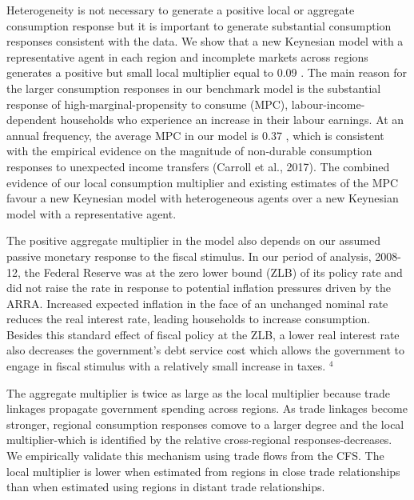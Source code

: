 \documentclass[10pt]{article}
\begin{document}
Heterogeneity is not necessary to generate a positive local or aggregate consumption response but it is important to generate substantial consumption responses consistent with the data. We show that a new Keynesian model with a representative agent in each region and incomplete markets across regions generates a positive but small local multiplier equal to 0.09 . The main reason for the larger consumption responses in our benchmark model is the substantial response of high-marginal-propensity to consume (MPC), labour-income-dependent households who experience an increase in their labour earnings. At an annual frequency, the average MPC in our model is 0.37 , which is consistent with the empirical evidence on the magnitude of non-durable consumption responses to unexpected income transfers (Carroll et al., 2017). The combined evidence of our local consumption multiplier and existing estimates of the MPC favour a new Keynesian model with heterogeneous agents over a new Keynesian model with a representative agent.

The positive aggregate multiplier in the model also depends on our assumed passive monetary response to the fiscal stimulus. In our period of analysis, 2008-12, the Federal Reserve was at the zero lower bound (ZLB) of its policy rate and did not raise the rate in response to potential inflation pressures driven by the ARRA. Increased expected inflation in the face of an unchanged nominal rate reduces the real interest rate, leading households to increase consumption. Besides this standard effect of fiscal policy at the ZLB, a lower real interest rate also decreases the government's debt service cost which allows the government to engage in fiscal stimulus with a relatively small increase in taxes. ${ }^{4}$

The aggregate multiplier is twice as large as the local multiplier because trade linkages propagate government spending across regions. As trade linkages become stronger, regional consumption responses comove to a larger degree and the local multiplier-which is identified by the relative cross-regional responses-decreases. We empirically validate this mechanism using trade flows from the CFS. The local multiplier is lower when estimated from regions in close trade relationships than when estimated using regions in distant trade relationships.
\end{document}
